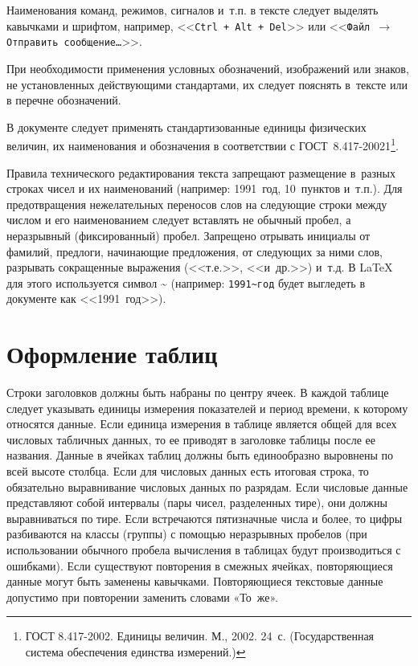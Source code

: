 \documentclass[PI,VKR]{HSEUniversity}
\begin{document}
Наименования команд, режимов, сигналов и т.п. в тексте следует выделять кавычками и шрифтом, например, <<\texttt{Ctrl + Alt + Del}>> или <<\texttt{Файл $\rightarrow$ Отправить сообщение\dots}>>.

При необходимости применения условных обозначений, изображений или знаков, не установленных действующими стандартами, их следует пояснять в тексте или в перечне обозначений.

В документе следует применять стандартизованные единицы физических величин, их наименования и обозначения в соответствии с ГОСТ 8.417-20021\footnote{ГОСТ 8.417-2002. Единицы величин. М., 2002. 24 с. (Государственная система обеспечения единства измерений.)}.  

Правила технического редактирования текста запрещают размещение в разных строках чисел и их наименований (например: 1991~год, 10~пунктов и т.п.). Для предотвращения нежелательных переносов слов на следующие строки между числом и его наименованием следует вставлять не обычный пробел, а неразрывный (фиксированный) пробел. Запрещено отрывать инициалы от фамилий, предлоги, начинающие предложения, от следующих за ними слов, разрывать сокращенные выражения (<<т.е.>>, <<и др.>>) и т.д. В \LaTeX{} для этого используется символ \textasciitilde{} (например: \texttt{1991\textasciitilde{}год} будет выгледеть в документе как <<1991~год>>).

\section{Оформление таблиц} 
%
Строки заголовков должны быть набраны по центру ячеек. В каждой таблице следует указывать единицы измерения показателей и период времени, к которому относятся данные. Если единица измерения в таблице является общей для всех числовых табличных данных, то ее приводят в заголовке таблицы после ее названия.
Данные в ячейках таблиц должны быть единообразно выровнены по всей высоте столбца. Если для числовых данных есть итоговая строка, то обязательно выравнивание числовых данных по разрядам. Если числовые данные представляют собой интервалы (пары чисел, разделенных тире), они должны выравниваться по тире. Если встречаются пятизначные числа и более, то цифры разбиваются на классы (группы) с помощью неразрывных пробелов (при использовании обычного пробела вычисления в таблицах будут производиться с ошибками). Если существуют повторения в смежных ячейках, повторяющиеся данные могут быть заменены кавычками. Повторяющиеся текстовые данные допустимо при повторении заменить словами «То же».
\end{document}
